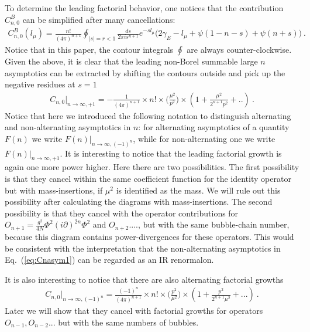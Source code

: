 \documentclass[a4paper,11pt]{article}
\begin{document}
To determine the leading factorial behavior, one notices that the contribution $C_{n,0}^B$ can be simplified after many cancellations:
\begin{align}\label{eq:CBn}
C_{n,0}^B(l_{\mu})=\frac{n!}{(4\pi)^{n+1}}\oint_{|s|=r<1}\frac{ds}{2\pi i s^{n+1}}e^{-sl_{\mu}}\bigg(2\gamma_E-l_{\mu}+\psi(1-n-s)+\psi(n+s)\bigg) \ .
\end{align}
Notice that in this paper, the contour integrals $\oint$ are always counter-clockwise.  Given the above, it is clear that the leading non-Borel summable large $n$ asymptotics can be extracted by shifting the contours outside and pick up the negative residues at $s=1$
\begin{align}\label{eq:Cnasym1}
C_{n,0}\bigg|_{n\rightarrow\infty,+1}=-\frac{1}{(4\pi)^{n+1}}\times n!\times \bigg(\frac{\mu^2}{p^2}\bigg)\times\left(1+\frac{\mu^2}{2^{n+1}p^2}+..\right) \ .
\end{align}
Notice that here we introduced the following notation to distinguish alternating and non-alternating asymptotics in $n$: for alternating asymptotics of a quantity $F(n)$ we write $F(n)|_{n\rightarrow\infty,(-1)^n}$, while for non-alternating one we write $F(n)|_{n\rightarrow\infty,+1}$. 
It is interesting to notice that the leading factorial growth is again one more power higher. Here there are two possibilities. The first possibility is that they cancel within the same coefficient function for the identity operator but with mass-insertions, if $\mu^2$ is identified as the mass. We will rule out this possibility after calculating the diagrams with mass-insertions. The second possibility is that they cancel with the operator contributions for $O_{n+1}=\frac{g^2}{4N}\Phi^2(i\partial)^{2n}\Phi^2$ and $O_{n+2}$...., but with the same bubble-chain number, because this diagram contains power-divergences for these operators. This would be consistent with the interpretation that the non-alternating asymptotics in Eq.~(\ref{eq:Cnasym1}) can be regarded as an IR renormalon.

It is also interesting to notice that there are also alternating factorial growths
\begin{align}\label{eq:Cnasym2}
C_{n,0}\bigg|_{n\rightarrow \infty,(-1)^n}=\frac{(-1)^n}{(4\pi)^{n+1}}\times n!\times \bigg(\frac{p^2}{\mu^2}\bigg)\times\left(1+\frac{p^2}{2^{n+1}\mu^2}+...\right) \ .
\end{align}
Later we will show that they cancel with factorial growths for operators $O_{n-1},O_{n-2}...$ but with the same numbers of bubbles.  
\end{document}
